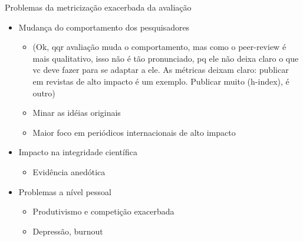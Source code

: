 \documentclass[bigger]{beamer}
\begin{document}
\begin{frame}[label={sec:orgcc4a393}]{Problemas da metricização exacerbada da avaliação}
\begin{itemize}
\item Mudança do comportamento dos pesquisadores
\begin{itemize}
\item (Ok, qqr avaliação muda o comportamento, mas como o peer-review é mais qualitativo, isso não é tão pronunciado, pq ele não deixa claro o que vc deve fazer para se adaptar a ele. As métricas deixam claro: publicar em revistas de alto impacto é um exemplo. Publicar muito (h-index), é outro)
\item Minar as idéias originais
\item Maior foco em periódicos internacionais de alto impacto
\end{itemize}

\item Impacto na integridade científica
\begin{itemize}
\item Evidência anedótica
\end{itemize}

\item Problemas a nível pessoal
\begin{itemize}
\item Produtivismo e competição exacerbada
\item Depressão, burnout
\end{itemize}
\end{itemize}
\end{frame}
\end{document}
